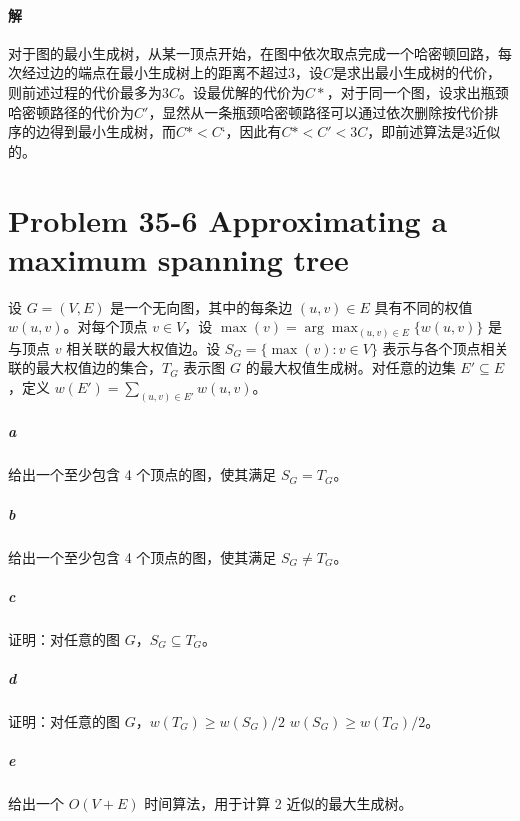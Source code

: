 \documentclass{article}
\begin{document}
\paragraph{解}
对于图的最小生成树，从某一顶点开始，在图中依次取点完成一个哈密顿回路，每次经过边的端点在最小生成树上的距离不超过3，设$C$是求出最小生成树的代价，则前述过程的代价最多为$3C$。设最优解的代价为$C*$，对于同一个图，设求出瓶颈哈密顿路径的代价为$C'$，显然从一条瓶颈哈密顿路径可以通过依次删除按代价排序的边得到最小生成树，而$C* < C‘$，因此有$C* < C' < 3C$，即前述算法是3近似的。

\section{Problem 35-6 Approximating a maximum spanning tree}
设 $G = (V, E)$ 是一个无向图，其中的每条边 $(u, v) \in E$ 具有不同的权值 $w(u,v)$。对每个顶点 $v \in V$，设 $\max{(v)} = \displaystyle \arg{\max_{(u,v) \in E}{\{ w(u, v) \}}}$ 是与顶点 $v$ 相关联的最大权值边。设 $S_G = \{ \max{(v)} : v \in V\} $ 表示与各个顶点相关联的最大权值边的集合，$T_G$ 表示图 $G$ 的最大权值生成树。对任意的边集 $E' \subseteq E$，定义 $w(E') = \displaystyle \sum_{(u,v) \in E'}{w(u,v)}$。
\subparagraph{a} 给出一个至少包含 4 个顶点的图，使其满足 $S_G = T_G$。
\subparagraph{b} 给出一个至少包含 4 个顶点的图，使其满足 $S_G \neq T_G$。
\subparagraph{c} 证明：对任意的图 $G$，$S_G \subseteq T_G$。
\subparagraph{d} 证明：对任意的图 $G$，\sout{$w(T_G) \geq w(S_G) / 2$}   $ w(S_G) \geq w(T_G) / 2$。
\subparagraph{e} 给出一个 $O(V + E)$ 时间算法，用于计算 2 近似的最大生成树。
\end{document}
